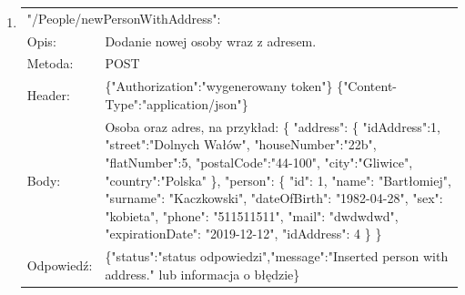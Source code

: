 \documentclass[12pt, titlepage]{article}
\begin{document}
\begin{enumerate}
	\item
	{\renewcommand{\arraystretch}{1.5}
	\begin{tabular}[t]{p{3cm} p{15cm}}
	\multicolumn{2}{l}{"/People/newPersonWithAddress":} \\
	Opis: & Dodanie nowej osoby wraz z adresem. \\
	Metoda: & POST \\
	Header: & \{"Authorization":"wygenerowany token"\} \newline \{"Content-Type":"application/json"\} \\
	Body: & Osoba oraz adres, na przykład: \newline \{
    "address":\newline
        \{
            "idAddress":1,\newline
                "street":"Dolnych Wałów",\newline
                "houseNumber":"22b",\newline
                "flatNumber":5,\newline
                "postalCode":"44-100",\newline
                "city":"Gliwice",\newline
                "country":"Polska"\newline
        \},\newline
        "person":\newline
        \{
            "id": 1,\newline
                "name": "Bartłomiej",\newline
                "surname": "Kaczkowski",\newline
                "dateOfBirth": "1982-04-28",\newline
                "sex": "kobieta",\newline
                "phone": "511511511",\newline
                "mail": "dwdwdwd",\newline
                "expirationDate": "2019-12-12",\newline
                "idAddress": 4\newline
        \}
\} \\
	Odpowiedź: & \{"status":"status odpowiedzi",\newline "message":"Inserted person with address." lub informacja o błędzie\} \\
	\end{tabular}}
	

\end{enumerate}
\end{document}
